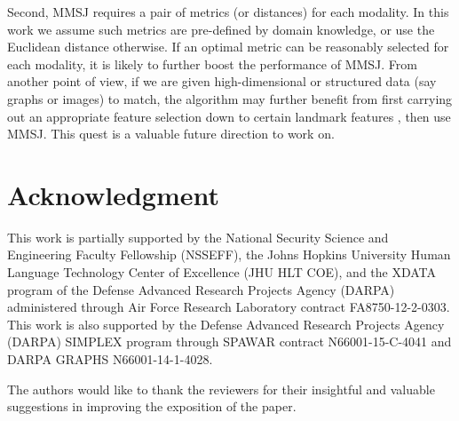 \documentclass[times,twocolumn,final]{elsarticle}
\begin{document}
Second, MMSJ requires a pair of metrics (or distances) for each modality. In this work we assume such metrics are pre-defined by domain knowledge, or use the Euclidean distance otherwise. If an optimal metric can be reasonably selected for each modality, it is likely to further boost the performance of MMSJ. From another point of view, if we are given high-dimensional or structured data (say graphs or images) to match, the algorithm may further benefit from first carrying out an appropriate feature selection down to certain landmark features \citep{JJ2008, ConteEtAl2004, FioriEtAl2013}, then use MMSJ. This quest is a valuable future direction to work on.

\section*{Acknowledgment}
This work is partially supported by the National Security Science and Engineering Faculty Fellowship (NSSEFF),
 the Johns Hopkins University Human Language Technology Center of Excellence (JHU HLT COE), and the
 XDATA program of the Defense Advanced Research Projects Agency (DARPA) administered through Air Force Research Laboratory contract FA8750-12-2-0303. This work is also supported by the Defense Advanced Research Projects Agency (DARPA) SIMPLEX program through SPAWAR contract N66001-15-C-4041 and DARPA GRAPHS N66001-14-1-4028.

The authors would like to thank the reviewers for their insightful and valuable suggestions in improving the exposition of the paper.





\end{document}
